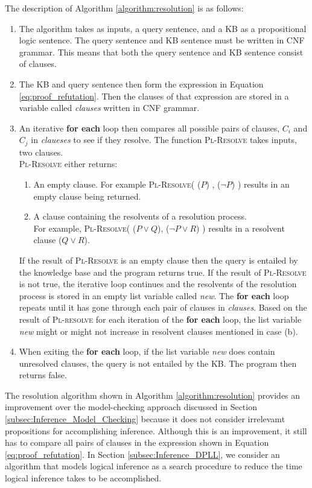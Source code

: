 The description of Algorithm \ref{algorithm:resolution} is as follows:
\begin{enumerate}
\item The algorithm takes as inputs, a query sentence, and a KB as a propositional logic sentence. The query sentence and KB sentence must be written in CNF grammar. This means that both the query sentence and KB sentence consist of clauses.
\item The KB and query sentence then form the expression in Equation \ref{eq:proof_refutation}. Then the clauses of that expression are stored in a variable called \textit{clauses} written in CNF grammar. 

\item An iterative \textbf{for each} loop then compares all possible pairs of clauses, $C_i$ and $C_j$ in \textit{claueses} to see if they resolve. The function \textsc{Pl-Resolve} takes inputs, two clauses. \\ \textsc{Pl-Resolve} either returns:

\begin{enumerate}
\item An empty clause. For example \textsc{Pl-Resolve}( ($P$) , ($\neg P$) ) results in an empty clause being returned.
\item A clause containing the resolvents of a resolution process.\\ For example, \textsc{Pl-Resolve}( ($P \vee Q$), ($\neg P \vee R$) ) results in a resolvent clause ($Q \vee R$).
\end{enumerate}

If the result of \textsc{Pl-Resolve} is an empty clause then the query is entailed by the knowledge base and the program returns true.
If the result of \textsc{Pl-Resolve} is not true, the iterative loop continues and the resolvents of the resolution process is stored in an empty list variable called \textit{new}. The \textbf{for each} loop repeats until it has gone through each pair of clauses in \textit{clauses}. Based on the result of \textsc{Pl-resolve} for each iteration of the \textbf{for each} loop, the list variable \textit{new} might or might not increase in resolvent clauses mentioned in case (b).
\item When exiting the \textbf{for each} loop, if the list variable \textit{new} does contain unresolved clauses, the query is not entailed by the KB. The program then returns false.
\end{enumerate}

The resolution algorithm shown in Algorithm \ref{algorithm:resolution} provides an improvement over the model-checking approach discussed in Section \ref{subsec:Inference_Model_Checking} because it does not consider irrelevamt propositions for accomplishing inference. Although this is an improvement, it still has to compare all pairs of clauses in the expression shown in Equation \ref{eq:proof_refutation}. In Section \ref{subsec:Inference_DPLL}, we consider an algorithm that models logical inference as a search procedure to reduce the time logical inference takes to be accomplished.

